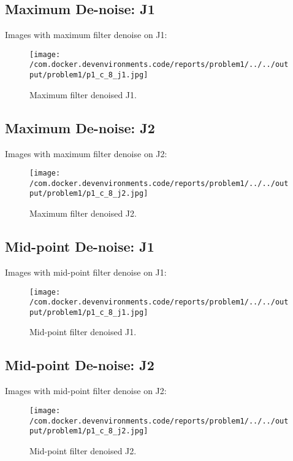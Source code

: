 \documentclass{article}%
\begin{document}
%
\newpage%
\subsection{Maximum De{-}noise: J1}%
\label{subsec:MaximumDe{-}noiseJ1}%
Images with maximum filter denoise on J1:%


\begin{figure}[h!]%
\centering%
\texttt{[image: /com.docker.devenvironments.code/reports/problem1/../../output/problem1/p1\_c\_8\_j1.jpg]}%
\caption{Maximum filter denoised J1.}%
\end{figure}

%
\subsection{Maximum De{-}noise: J2}%
\label{subsec:MaximumDe{-}noiseJ2}%
Images with maximum filter denoise on J2:%


\begin{figure}[h!]%
\centering%
\texttt{[image: /com.docker.devenvironments.code/reports/problem1/../../output/problem1/p1\_c\_8\_j2.jpg]}%
\caption{Maximum filter denoised J2.}%
\end{figure}

%
\subsection{Mid{-}point De{-}noise: J1}%
\label{subsec:Mid{-}pointDe{-}noiseJ1}%
Images with mid{-}point filter denoise on J1:%


\begin{figure}[h!]%
\centering%
\texttt{[image: /com.docker.devenvironments.code/reports/problem1/../../output/problem1/p1\_c\_8\_j1.jpg]}%
\caption{Mid{-}point filter denoised J1.}%
\end{figure}

%
\subsection{Mid{-}point De{-}noise: J2}%
\label{subsec:Mid{-}pointDe{-}noiseJ2}%
Images with mid{-}point filter denoise on J2:%


\begin{figure}[h!]%
\centering%
\texttt{[image: /com.docker.devenvironments.code/reports/problem1/../../output/problem1/p1\_c\_8\_j2.jpg]}%
\caption{Mid{-}point filter denoised J2.}%
\end{figure}

%
\end{document}
